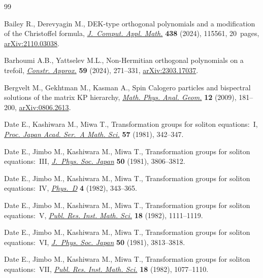 \begin{thebibliography}{99}
\footnotesize\itemsep=0pt

Bailey R., Derevyagin M., D{EK}-type orthogonal polynomials and a modification
 of the {C}hristoffel formula,
 \href{https://doi.org/10.1016/j.cam.2023.115561}{\textit{J.~Comput. Appl.
 Math.}} \textbf{438} (2024), 115561, 20~pages,
 \href{http://arxiv.org/abs/2110.03038}{arXiv:2110.03038}.

Barhoumi A.B., Yattselev M.L., Non-{H}ermitian orthogonal polynomials on a
 trefoil, \href{https://doi.org/10.1007/s00365-023-09640-6}{\textit{Constr.
 Approx.}} \textbf{59} (2024), 271--331,
 \href{http://arxiv.org/abs/2303.17037}{arXiv:2303.17037}.

Bergvelt M., Gekhtman M., Kasman A., Spin {C}alogero particles and bispectral
 solutions of the matrix {KP} hierarchy,
 \href{https://doi.org/10.1007/s11040-009-9058-y}{\textit{Math. Phys. Anal.
 Geom.}} \textbf{12} (2009), 181--200,
 \href{http://arxiv.org/abs/0806.2613}{arXiv:0806.2613}.

Date E., Kashiwara M., Miwa T., Transformation groups for soliton
 equations:~{I}, \href{https://doi.org/10.3792/pjaa.57.342}{\textit{Proc.
 Japan Acad. Ser.~A Math. Sci.}} \textbf{57} (1981), 342--347.

Date E., Jimbo M., Kashiwara M., Miwa T., Transformation groups for soliton
 equations:~{III},
 \href{https://doi.org/10.1143/JPSJ.50.3806}{\textit{J.~Phys. Soc. Japan}}
 \textbf{50} (1981), 3806--3812.

Date E., Jimbo M., Kashiwara M., Miwa T., Transformation groups for soliton
 equations:~{IV},
 \href{https://doi.org/10.1016/0167-2789(82)90041-0}{\textit{Phys.~D}}
 \textbf{4} (1982), 343--365.

Date E., Jimbo M., Kashiwara M., Miwa T., Transformation groups for soliton
 equations:~{V}, \href{https://doi.org/10.2977/prims/1195183298}{\textit{Publ.
 Res. Inst. Math. Sci.}} \textbf{18} (1982), 1111--1119.

Date E., Jimbo M., Kashiwara M., Miwa T., Transformation groups for soliton
 equations:~{VI}, \href{https://doi.org/10.1143/JPSJ.50.3813}{\textit{J.~Phys.
 Soc. Japan}} \textbf{50} (1981), 3813--3818.

Date E., Jimbo M., Kashiwara M., Miwa T., Transformation groups for soliton
 equations:~{VII},
 \href{https://doi.org/10.2977/PRIMS/1195183297}{\textit{Publ. Res. Inst.
 Math. Sci.}} \textbf{18} (1982), 1077--1110.


\end{thebibliography}
